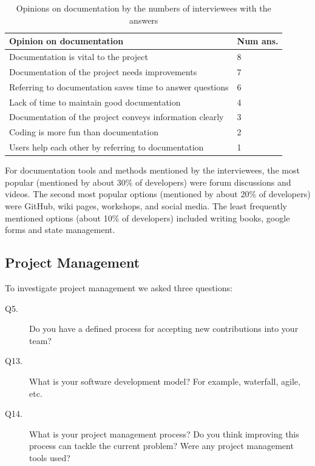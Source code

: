 \documentclass[final, 3p, times, authoryear]{elsarticle}
\begin{document}
\begin{table}[!ht]
\centering
\begin{tabular}{ll}
\toprule
Opinion on documentation & Num ans. \\ 
\midrule
Documentation is vital to the project & 8 \\
Documentation of the project needs improvements & 7 \\
Referring to documentation saves time to answer questions & 6 \\
Lack of time to maintain good documentation & 4 \\
Documentation of the project conveys information clearly & 3 \\
Coding is more fun than documentation & 2 \\
Users help each other by referring to documentation & 1 \\ 
\bottomrule
\end{tabular}
\caption{\label{tab_opinion_doc}Opinions on documentation by the numbers of
interviewees with the answers}
\end{table}

For documentation tools and methods mentioned by the interviewees, the most
popular (mentioned by about 30\% of developers) were forum discussions and
videos.  The second most popular options (mentioned by about 20\% of developers)
were GitHub, wiki pages, workshops, and social media.  The least frequently
mentioned options (about 10\% of developers) included writing books, google
forms and state management.

\subsection{Project Management} \label{sec_contribution_pm}

To investigate project management we asked three questions:

\begin{description}
\item[Q5.] Do you have a defined process for accepting new contributions into
your team?
\item[Q13.] What is your software development model? For example, waterfall,
agile, etc.
\item[Q14.] What is your project management process? Do you
think improving this process can tackle the current problem? Were any project
management tools used?
\end{description}
\end{document}
